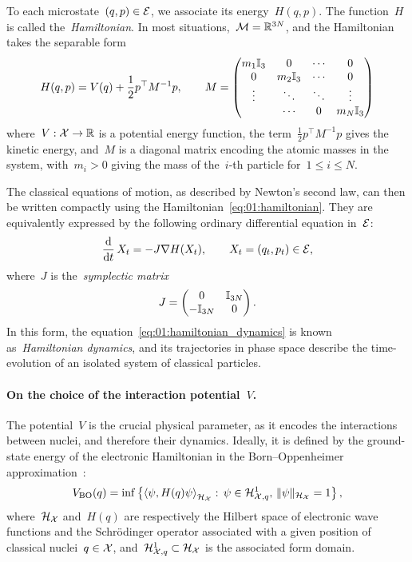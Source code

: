 To each microstate~$(q,p)\in\mathcal{E}$, we associate its energy~$H(q,p)$. The function~$H$ is called the~\textit{Hamiltonian}. In most situations,~$\mathcal{M}=\mathbb{R}^{3N}$, and the Hamiltonian takes the separable form
\begin{equation}
    \label{eq:01:hamiltonian}
    H(q,p) = V(q) + \frac12p^\top M^{-1}p,\qquad M = \begin{pmatrix}
    m_1 \mathbb{I}_3 & 0 & \dotsm & 0 \\
    0 & m_2 \mathbb{I}_3 & \dotsm & 0 \\
    \vdots & \ddots & \ddots & \vdots\\
    & \dotsm & 0 & m_N \mathbb{I}_3 
\end{pmatrix}
\end{equation}
where~$V:\mathcal{X}\to\mathbb{R}$ is a potential energy function, the term~$\frac12p^\top M^{-1}p$ gives the kinetic energy, and~$M$ is a diagonal matrix encoding the atomic masses in the system, with~$m_i>0$ giving the mass of the~$i$-th particle for~$1\leq i\leq N$.

The classical equations of motion, as described by Newton's second law, can then be written compactly using the Hamiltonian~\eqref{eq:01:hamiltonian}. They are equivalently expressed by the following ordinary differential equation in~$\mathcal{E}$:
\begin{equation}
    \label{eq:01:hamiltonian_dynamics}
    \frac{\mathrm{d}}{\mathrm{d} t}\,X_t = -J\nabla H(X_t),\qquad X_t = (q_t,p_t)\in \mathcal{E},
\end{equation}
where~$J$ is the~\textit{symplectic matrix}
\begin{equation}
    \label{eq:01:J}
    J=\begin{pmatrix}
        0&\mathbb{I}_{3N}\\-\mathbb{I}_{3N}&0
    \end{pmatrix}.
\end{equation}
In this form, the equation~\eqref{eq:01:hamiltonian_dynamics} is known as~\textit{Hamiltonian dynamics}, and its trajectories in phase space describe the time-evolution of an isolated system of classical particles.

\paragraph{On the choice of the interaction potential~$V$.}
The potential~$V$ is the crucial physical parameter, as it encodes the interactions between nuclei, and therefore their dynamics. Ideally, it is defined by the ground-state energy of the electronic Hamiltonian in the Born--Oppenheimer approximation~\cite{BO27}:
\begin{equation}
    \label{eq:01:schrodinger}
    V_{\mathrm{BO}}(q) = \inf\left\{\left\langle\psi, H(q) \psi\right\rangle_{\mathcal H_{\mathcal{X}}}:\,\psi \in \mathcal H^1_{\mathcal{X},q},\,\|\psi\|_{\mathcal H_{\mathcal{X}}}=1\right\},
\end{equation}
where~$\mathcal H_{\mathcal{X}}$ and~$H(q)$ are respectively the Hilbert space of electronic wave functions and the Schr\"odinger operator associated with a given position of classical nuclei~$q\in\mathcal{X}$, and~$\mathcal H^1_{\mathcal{X},q}\subset \mathcal H_{\mathcal{X}}$ is the associated form domain.

